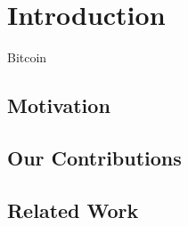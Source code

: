 \chapter{Introduction}\label{chapter:introduction}

Bitcoin \cite{bitcoin}

\section{Motivation}
\section{Our Contributions}
\section{Related Work}
